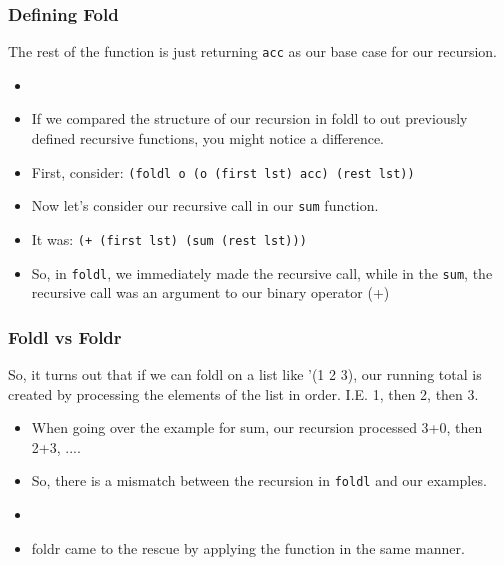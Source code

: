 \documentclass{beamer}
\begin{document}

\begin{frame}
  \frametitle{Defining Fold}
  The rest of the function is just returning \texttt{acc} as our base case
  for our recursion.
  \begin{itemize}
  \item<2-> \foldl
  \item<3-> If we compared the structure of our recursion in foldl
    to out previously defined recursive functions, you might notice a difference.
  \item<4-> First, consider: \texttt{(foldl o (o (first lst) acc) (rest lst))}
  \item<5-> Now let's consider our recursive call in our \texttt{sum}
    function.
  \item<6-> It was: \texttt{(+ (first lst) (sum (rest lst)))}
  \item<7-> So, in \texttt{foldl}, we immediately made the recursive
    call, while in the \texttt{sum}, the recursive call was an
    argument to our binary operator (+)
  \end{itemize}
\end{frame}


\begin{frame}
  \frametitle{Foldl vs Foldr}
  So, it turns out that if we can foldl on a list like '(1 2 3), our running
  total is created by processing the elements of the list in order. I.E.
  1, then 2, then 3.
  \begin{itemize}
  \item<2-> When going over the example for sum, our recursion processed 3+0, then 2+3, ....
  \item<3-> So, there is a mismatch between the recursion in \texttt{foldl} and our examples.
  \item<4-> \foldr
  \item<5-> foldr came to the rescue by applying the function in the same manner.
  \end{itemize}
\end{frame}
\end{document}
